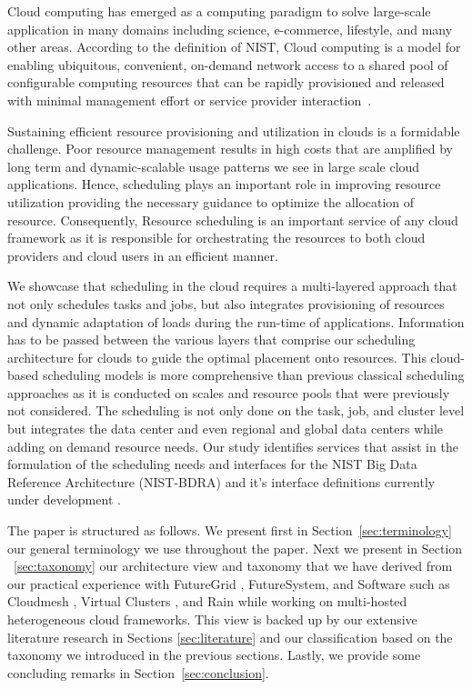 \documentclass[final,5p,times,twocolumn]{elsarticle}
\begin{document}
Cloud computing has emerged as a computing paradigm to solve
large-scale application in many domains including science, e-commerce, 
lifestyle, and many other areas. According to the definition of NIST, 
Cloud
computing is a model for enabling ubiquitous, convenient, on-demand
network access to a shared pool of configurable computing resources
that can be rapidly provisioned and released with minimal management
effort or service provider interaction~\cite{mell2011nist}.

Sustaining efficient resource provisioning and utilization in clouds
is a formidable challenge. Poor resource management results in high
costs that are amplified by long term and dynamic-scalable usage
patterns we see in large scale cloud applications. Hence, scheduling
plays an important role in improving resource utilization providing
the necessary guidance to optimize the allocation of resource.
Consequently, Resource scheduling is an important service of any cloud
framework as it is responsible for orchestrating the resources to both
cloud providers and cloud users in an efficient manner.

We showcase that scheduling in the cloud requires a multi-layered
approach that not only schedules tasks and jobs, but also integrates
provisioning of resources and dynamic adaptation of loads during the
run-time of applications. Information has to be passed between the
various layers that comprise our scheduling architecture for clouds to
guide the optimal placement onto resources. This cloud-based
scheduling models is more comprehensive than previous classical
scheduling approaches as it is conducted on scales and resource pools
that were previously not considered. The scheduling is not only done
on the task, job, and cluster level but integrates the data center and
even regional and global data centers while adding on demand resource
needs. Our study identifies services that assist in the formulation of
the scheduling needs and interfaces for the NIST Big Data Reference
Architecture (NIST-BDRA) \cite{nist-bdra-vol6} and it's interface
definitions currently under development \cite{nist-bdra-vol8}.

The paper is structured as follows. We present first in
Section~\ref{sec:terminology} our general terminology we use throughout
the paper. Next we present in Section ~\ref{sec:taxonomy} our
architecture view and taxonomy that we have derived from our practical
experience with FutureGrid
\cite{las12fg-bookchapter,fox2013futuregrid}, FutureSystem, and
Software such as Cloudmesh \cite{von2014accessing}, Virtual Clusters
\cite{las-comet}, and Rain \cite{las-fg-1295,las10dynamic,las-rain}
while working on multi-hosted heterogeneous cloud frameworks. This
view is backed up by our extensive literature research in Sections
\ref{sec:literature} and our classification based on the taxonomy we
introduced in the previous sections. Lastly, we provide some
concluding remarks in Section~\ref{sec:conclusion}.
\end{document}
